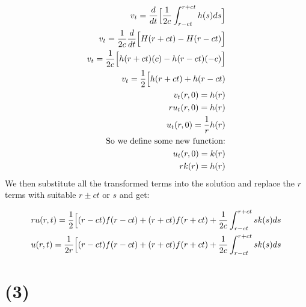 \documentclass{article}
\begin{document}
\begin{equation}
\begin{aligned}
v_t = \frac{d}{dt} \Big{[}\frac{1}{2c}\int^{r+ct}_{r-ct}h(s)ds \Big{]}\\
v_t =\frac{1}{2c} \frac{d}{dt} \Big{[}H(r+ct) - H(r-ct) \Big{]}\\
v_t = \frac{1}{2c} \Big{[}h(r+ct)(c) - h(r-ct)(-c)\Big{]}\\
v_t = \frac{1}{2} \Big{[}h(r+ct) + h(r-ct)\\
v_t(r,0) = h(r)\\
ru_t(r,0) = h(r)\\
u_t(r,0) = \frac{1}{r}h(r)\\
\text{So we define some new function:}\\
u_t(r,0) = k(r)\\
rk(r) = h(r)
\end{aligned}
\end{equation}
We then substitute all the transformed terms into the solution and replace the $r$ terms with suitable $r\pm ct$ or $s$ and get:
\begin{tcolorbox}[minipage,colback=white,arc=0pt,outer arc=0pt]
\begin{equation}
\begin{aligned}
ru(r,t) = \frac{1}{2} \Big{[}(r-ct)f(r-ct) + (r+ct)f(r+ct) + \frac{1}{2c}\int_{r-ct}^{r+ct}sk(s)ds\\
u(r,t) = \frac{1}{2r} \Big{[}(r-ct)f(r-ct) + (r+ct)f(r+ct) + \frac{1}{2c}\int_{r-ct}^{r+ct}sk(s)ds\\
\end{aligned}
\end{equation}
\end{tcolorbox}
\section*{\textbf{(3)}}
\end{document}
